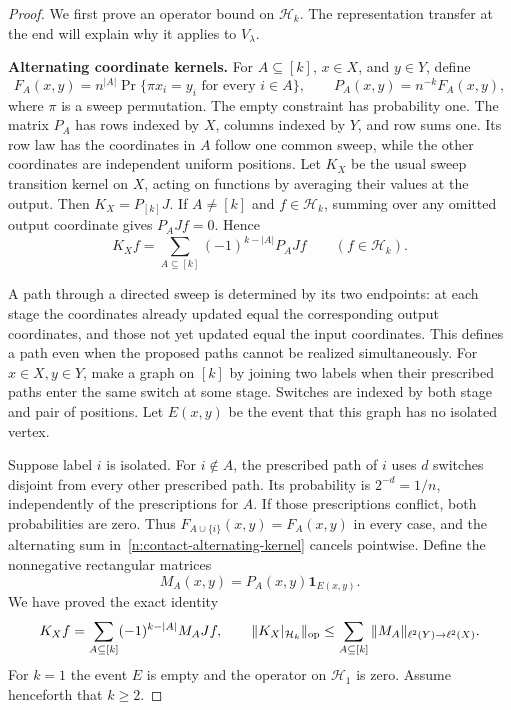 \begin{proof}
We first prove an operator bound on $\mathcal H_k$.  The representation
transfer at the end will explain why it applies to $V_\lambda$.

\medskip\noindent\textbf{Alternating coordinate kernels.}\enspace
For $A\subseteq[k]$, $x\in X$, and $y\in Y$, define
\[
 F_A(x,y)=n^{|A|}\Pr\{\pi x_i=y_i\text{ for every }i\in A\},
 \qquad P_A(x,y)=n^{-k}F_A(x,y),
\]
where $\pi$ is a sweep permutation.  The empty constraint has probability
one.  The matrix $P_A$ has rows indexed by $X$, columns indexed by $Y$,
and row sums one.  Its row law has the coordinates in $A$ follow one
common sweep, while the other coordinates are independent uniform
positions.  Let $K_X$ be the usual sweep transition kernel on $X$,
acting on functions by averaging their values at the output.  Then
$K_X=P_{[k]}J$.  If $A\ne[k]$ and $f\in\mathcal H_k$, summing over
any omitted output coordinate gives $P_AJf=0$.  Hence
\begin{equation}\label{n:contact-alternating-kernel}
 K_Xf=\sum_{A\subseteq[k]}(-1)^{k-|A|}P_AJf
 \qquad(f\in\mathcal H_k).
\end{equation}

A path through a directed sweep is determined by its two endpoints:
at each stage the coordinates already updated equal the corresponding
output coordinates, and those not yet updated equal the input
coordinates.  This defines a path even when the proposed paths cannot
be realized simultaneously.  For $x\in X,y\in Y$, make a graph on
$[k]$ by joining two labels when their prescribed paths enter the same
switch at some stage.  Switches are indexed by both stage and pair of
positions.  Let $E(x,y)$ be the event that this graph has no isolated
vertex.

Suppose label $i$ is isolated.  For $i\notin A$, the prescribed path
of $i$ uses $d$ switches disjoint from every other prescribed path.
Its probability is $2^{-d}=1/n$, independently of the prescriptions
for $A$.  If those prescriptions conflict, both probabilities are
zero.  Thus $F_{A\cup\{i\}}(x,y)=F_A(x,y)$ in every case, and the
alternating sum in~\eqref{n:contact-alternating-kernel} cancels pointwise.
Define the nonnegative rectangular matrices
\[
 M_A(x,y)=P_A(x,y)\mathbf1_{E(x,y)}.
\]
We have proved the exact identity
\[
 K_Xf=\sum_{A\subseteq[k]}(-1)^{k-|A|}M_AJf,
 \qquad
 \|K_X|_{\mathcal H_k}\|_{\mathrm{op}}
 \le\sum_{A\subseteq[k]}\|M_A\|_{\ell^2(Y)\to\ell^2(X)}.
\]
For $k=1$ the event $E$ is empty and the operator on $\mathcal H_1$
is zero.  Assume henceforth that $k\ge2$.


\end{proof}
